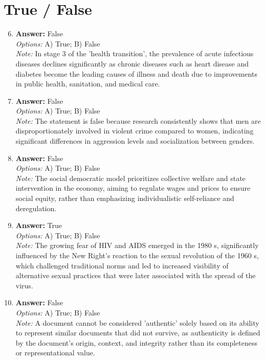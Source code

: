 \documentclass[12pt]{article}
\begin{document}
\section*{True / False}
\begin{enumerate}[label=\arabic*.]
\setcounter{enumi}{5}
\item \textbf{Answer:} False
\\ \textit{Options:} A) True; B) False
\\ \textit{Note:} In stage 3 of the 'health transition', the prevalence of acute infectious diseases declines significantly as chronic diseases such as heart disease and diabetes become the leading causes of illness and death due to improvements in public health, sanitation, and medical care.
\item \textbf{Answer:} False
\\ \textit{Options:} A) True; B) False
\\ \textit{Note:} The statement is false because research consistently shows that men are disproportionately involved in violent crime compared to women, indicating significant differences in aggression levels and socialization between genders.
\item \textbf{Answer:} False
\\ \textit{Options:} A) True; B) False
\\ \textit{Note:} The social democratic model prioritizes collective welfare and state intervention in the economy, aiming to regulate wages and prices to ensure social equity, rather than emphasizing individualistic self-reliance and deregulation.
\item \textbf{Answer:} True
\\ \textit{Options:} A) True; B) False
\\ \textit{Note:} The growing fear of HIV and AIDS emerged in the 1980 s, significantly influenced by the New Right's reaction to the sexual revolution of the 1960 s, which challenged traditional norms and led to increased visibility of alternative sexual practices that were later associated with the spread of the virus.
\item \textbf{Answer:} False
\\ \textit{Options:} A) True; B) False
\\ \textit{Note:} A document cannot be considered 'authentic' solely based on its ability to represent similar documents that did not survive, as authenticity is defined by the document's origin, context, and integrity rather than its completeness or representational value.
\end{enumerate}
\end{document}

